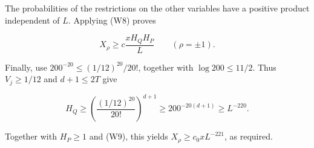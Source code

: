 The probabilities of the restrictions on the other variables have a
positive product independent of \(L\). Applying (W8) proves

\[
X_\rho\ge c\frac{xH_QH_P}L
\qquad(\rho=\pm1). \tag{W9}
\]

Finally, use \(200^{-20}\le (1/12)^{20}/20!\), together with
\(\log200\le11/2\). Thus \(V_j\ge1/12\) and \(d+1\le2T\) give

\[
H_Q\ge\left(\frac{(1/12)^{20}}{20!}\right)^{d+1}
 \ge200^{-20(d+1)}\ge L^{-220}.
\]

Together with \(H_P\ge1\) and (W9), this yields
\(X_\rho\ge c_0xL^{-221}\), as required.
